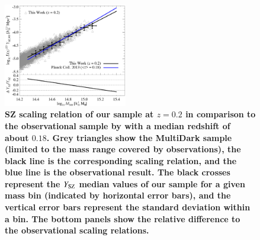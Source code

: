\documentclass[useAMS,usenatbib]{mn2e}
\begin{document}
\begin{figure} 
\centering
\includegraphics[width=0.48\textwidth]{figures/sz_m.eps}
\caption{{\bf SZ scaling relation of our sample at $z=0.2$ in comparison to the observational 
  sample by \protect\cite{2013arXiv1303.5080P} with a median redshift of about $0.18$.
  Grey triangles show the MultiDark sample (limited to the mass range covered by observations), 
  the black line is the corresponding scaling relation, and the blue line is the observational result. 
  The black crosses represent the $Y_{{\mathrm{SZ}}}$ median values of our sample for a given mass bin (indicated by 
  horizontal error bars), and the vertical error bars represent the standard deviation within a
  bin. The bottom panels show the relative difference to the observational scaling relations.}}
\label{fig:SZ_M}
\end{figure}
\end{document}
